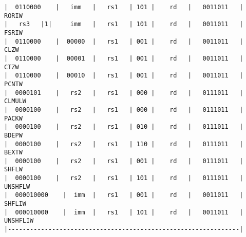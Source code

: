 \begin{minipage}{\linewidth}
\begin{verbatim}
|  0110000    |   imm   |   rs1   | 101 |    rd   |   0011011   |  RORIW
|   rs3   |1|     imm   |   rs1   | 101 |    rd   |   0011011   |  FSRIW
|  0110000    |  00000  |   rs1   | 001 |    rd   |   0011011   |  CLZW
|  0110000    |  00001  |   rs1   | 001 |    rd   |   0011011   |  CTZW
|  0110000    |  00010  |   rs1   | 001 |    rd   |   0011011   |  PCNTW
|  0000101    |   rs2   |   rs1   | 000 |    rd   |   0111011   |  CLMULW
|  0000100    |   rs2   |   rs1   | 000 |    rd   |   0111011   |  PACKW
|  0000100    |   rs2   |   rs1   | 010 |    rd   |   0111011   |  BDEPW
|  0000100    |   rs2   |   rs1   | 110 |    rd   |   0111011   |  BEXTW
|  0000100    |   rs2   |   rs1   | 001 |    rd   |   0111011   |  SHFLW
|  0000100    |   rs2   |   rs1   | 101 |    rd   |   0111011   |  UNSHFLW
|  000010000    |  imm  |   rs1   | 001 |    rd   |   0011011   |  SHFLIW
|  000010000    |  imm  |   rs1   | 101 |    rd   |   0011011   |  UNSHFLIW
|---------------------------------------------------------------|
\end{verbatim}
\end{minipage}
